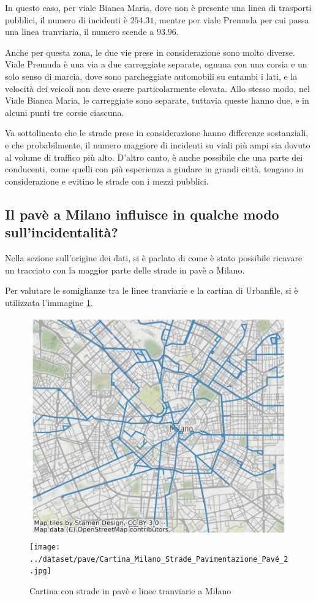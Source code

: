 \documentclass[a4paper,12pt]{report}
\begin{document}
In questo caso, per viale Bianca Maria, dove non è presente una linea di trasporti pubblici, 
il numero di incidenti è $254.31$, mentre per viale Premuda per cui passa una linea tranviaria, 
il numero scende a $93.96$.

Anche per questa zona, le due vie prese in considerazione sono molto diverse.
Viale Premuda è una via a due carreggiate separate, ognuna con una corsia e un solo senso 
di marcia, dove sono parcheggiate automobili su entambi i lati, e la velocità dei 
veicoli non deve essere particolarmente elevata.
Allo stesso modo, nel Viale Bianca Maria, le carreggiate sono separate, tuttavia queste 
hanno due, e in alcuni punti tre corsie ciascuna. 

Va sottolineato che le strade prese in considerazione hanno differenze sostanziali, e che 
probabilmente, il numero maggiore di incidenti su viali più ampi sia dovuto al 
volume di traffico più alto.
D'altro canto, è anche possibile che una parte dei conducenti, come quelli con più esperienza 
a giudare in grandi città, tengano in considerazione e evitino le strade con i mezzi pubblici.

\subsection{Il pavè a Milano influisce in qualche modo sull'incidentalità?}

Nella sezione sull'origine dei dati, si è parlato di come è stato possibile ricavare 
un tracciato con la maggior parte delle strade in pavè a Milano.

Per valutare le somiglianze tra le linee tranviarie e la cartina di 
Urbanfile, si è utilizzata l'immagine \ref{fig:tram-pave-milano}.

\begin{figure}
    \includegraphics[width=0.48\linewidth]{../src/tram/tram_milano.png}
    \texttt{[image: ../dataset/pave/Cartina\_Milano\_Strade\_Pavimentazione\_Pavé\_2.jpg]}
    \caption{Cartina con strade in pavè e linee tranviarie a Milano}
    \label{fig:tram-pave-milano}
\end{figure}
\end{document}
